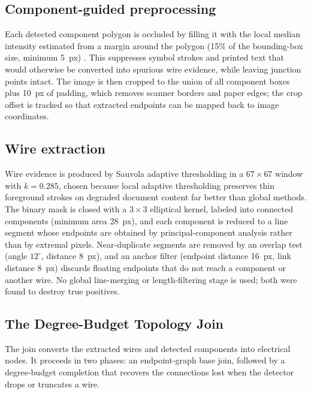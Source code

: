 \subsection*{Component-guided preprocessing}

Each detected component polygon is occluded by filling it with the local median
intensity estimated from a margin around the polygon (15\% of the bounding-box
size, minimum 5~px) \cite{Bradski2000}. This suppresses symbol strokes and printed
text that would otherwise be converted into spurious wire evidence, while leaving
junction points intact. The image is then cropped to the union of all component
boxes plus 10~px of padding, which removes scanner borders and paper edges; the
crop offset is tracked so that extracted endpoints can be mapped back to image
coordinates.

\subsection*{Wire extraction}

Wire evidence is produced by Sauvola adaptive thresholding \cite{Sauvola2000} in a
$67 \times 67$ window with $k = 0.285$, chosen because local adaptive thresholding
preserves thin foreground strokes on degraded document content far better than
global methods. The binary mask is closed with a $3 \times 3$ elliptical kernel,
labeled into connected components (minimum area 28~px), and each component is
reduced to a line segment whose endpoints are obtained by principal-component
analysis rather than by extremal pixels. Near-duplicate segments are removed by an
overlap test (angle $12^\circ$, distance 8~px), and an anchor filter
(endpoint distance 16~px, link distance 8~px) discards floating endpoints that do
not reach a component or another wire. No global line-merging or length-filtering
stage is used; both were found to destroy true positives.

\subsection*{The Degree-Budget Topology Join}

The join converts the extracted wires and detected components into electrical
nodes. It proceeds in two phases: an endpoint-graph base join, followed by a
degree-budget completion that recovers the connections lost when the detector
drops or truncates a wire.

